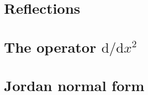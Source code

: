 \documentclass[letter-paper]{tufte-book}
\begin{document}
\section{Reflections}


\section{The operator $\mathrm{d}/\mathrm{d}x^2$}


\section{Jordan normal form}








\mainmatter




%


\end{document}

